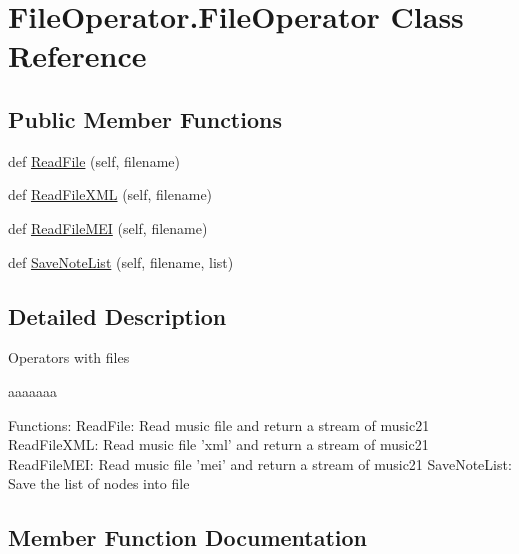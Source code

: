 \hypertarget{class_file_operator_1_1_file_operator}{}\section{File\+Operator.\+File\+Operator Class Reference}
\label{class_file_operator_1_1_file_operator}
\subsection*{Public Member Functions}
\begin{DoxyCompactItemize}
\item 
def \mbox{\hyperlink{class_file_operator_1_1_file_operator_af3e38c65dc3e7c81462b0aea788837b5}{Read\+File}} (self, filename)
\item 
def \mbox{\hyperlink{class_file_operator_1_1_file_operator_a9b2a851469c6c2398bdf94e0298a76ad}{Read\+File\+X\+ML}} (self, filename)
\item 
def \mbox{\hyperlink{class_file_operator_1_1_file_operator_aa89d861e179ddaea8d9e020e6b14d23e}{Read\+File\+M\+EI}} (self, filename)
\item 
def \mbox{\hyperlink{class_file_operator_1_1_file_operator_a7dbbfd470da774ca20346a568bf88a66}{Save\+Note\+List}} (self, filename, list)
\end{DoxyCompactItemize}


\subsection{Detailed Description}
\begin{DoxyVerb}Operators with files

aaaaaaa

Functions:
    ReadFile: Read music file and return a stream of music21
    ReadFileXML: Read music file 'xml' and return a stream of music21
    ReadFileMEI: Read music file 'mei' and return a stream of music21
    SaveNoteList: Save the list of nodes into file
\end{DoxyVerb}
 

\subsection{Member Function Documentation}
\mbox{\label{class_file_operator_1_1_file_operator_af3e38c65dc3e7c81462b0aea788837b5}} 
